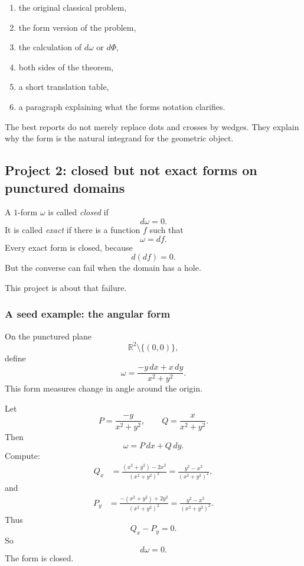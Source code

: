 \begin{enumerate}
\item the original classical problem,

\item the form version of the problem,

\item the calculation of \(d\omega\) or \(d\Phi\),

\item both sides of the theorem,

\item a short translation table,

\item a paragraph explaining what the forms notation clarifies.
\end{enumerate}

The best reports do not merely replace dots and crosses by wedges.  They explain why
the form is the natural integrand for the geometric object.

\subsection{Project 2: closed but not exact forms on punctured domains}

A \(1\)-form \(\omega\) is called \emph{closed} if
\[
    d\omega=0.
\]
It is called \emph{exact} if there is a function \(f\) such that
\[
    \omega=df.
\]
Every exact form is closed, because
\[
    d(df)=0.
\]
But the converse can fail when the domain has a hole.

This project is about that failure.

\subsubsection*{A seed example: the angular form}

On the punctured plane
\[
    \mathbb R^2\setminus\{(0,0)\},
\]
define
\[
\boxed{
    \omega=
    \frac{-y\,dx+x\,dy}{x^2+y^2}.
}
\]
This form measures change in angle around the origin.

Let
\[
    P=\frac{-y}{x^2+y^2},
    \qquad
    Q=\frac{x}{x^2+y^2}.
\]
Then
\[
    \omega=P\,dx+Q\,dy.
\]
Compute:
\[
\begin{aligned}
    Q_x
    &=
    \frac{(x^2+y^2)-2x^2}{(x^2+y^2)^2}
    =
    \frac{y^2-x^2}{(x^2+y^2)^2},
\end{aligned}
\]
and
\[
\begin{aligned}
    P_y
    &=
    \frac{-(x^2+y^2)+2y^2}{(x^2+y^2)^2}
    =
    \frac{y^2-x^2}{(x^2+y^2)^2}.
\end{aligned}
\]
Thus
\[
    Q_x-P_y=0.
\]
So
\[
\boxed{
    d\omega=0.
}
\]
The form is closed.

